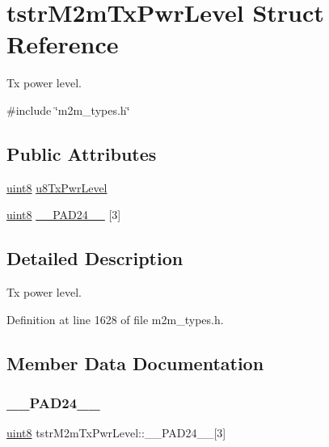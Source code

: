 \hypertarget{structtstrM2mTxPwrLevel}{}\section{tstr\+M2m\+Tx\+Pwr\+Level Struct Reference}
\label{structtstrM2mTxPwrLevel}


Tx power level.  




{\ttfamily \#include \char`\"{}m2m\+\_\+types.\+h\char`\"{}}

\subsection*{Public Attributes}
\begin{DoxyCompactItemize}
\item 
\hyperlink{group__DataT_ga4df709a77647e870bbf1d955b8edc9a6}{uint8} \hyperlink{structtstrM2mTxPwrLevel_ab62abb8131e3179d272a7f751b95d607}{u8\+Tx\+Pwr\+Level}
\item 
\hyperlink{group__DataT_ga4df709a77647e870bbf1d955b8edc9a6}{uint8} \hyperlink{structtstrM2mTxPwrLevel_ac1702a08026fa62692c9d66639d322bb}{\+\_\+\+\_\+\+P\+A\+D24\+\_\+\+\_\+} \mbox{[}3\mbox{]}
\end{DoxyCompactItemize}


\subsection{Detailed Description}
Tx power level. 

Definition at line 1628 of file m2m\+\_\+types.\+h.



\subsection{Member Data Documentation}
\mbox{\label{structtstrM2mTxPwrLevel_ac1702a08026fa62692c9d66639d322bb}} 
\subsubsection{\texorpdfstring{\+\_\+\+\_\+\+P\+A\+D24\+\_\+\+\_\+}{\_\_PAD24\_\_}}
{\footnotesize\ttfamily \hyperlink{group__DataT_ga4df709a77647e870bbf1d955b8edc9a6}{uint8} tstr\+M2m\+Tx\+Pwr\+Level\+::\+\_\+\+\_\+\+P\+A\+D24\+\_\+\+\_\+\mbox{[}3\mbox{]}}

